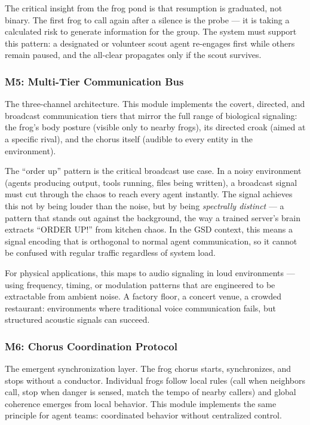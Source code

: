 \documentclass[11pt,letterpaper]{article}
\begin{document}
The critical insight from the frog pond is that resumption is graduated, not binary. The first frog to call again after a silence is the probe --- it is taking a calculated risk to generate information for the group. The system must support this pattern: a designated or volunteer scout agent re-engages first while others remain paused, and the all-clear propagates only if the scout survives.

\subsubsection{M5: Multi-Tier Communication Bus}

The three-channel architecture. This module implements the covert, directed, and broadcast communication tiers that mirror the full range of biological signaling: the frog's body posture (visible only to nearby frogs), its directed croak (aimed at a specific rival), and the chorus itself (audible to every entity in the environment).

The ``order up'' pattern is the critical broadcast use case. In a noisy environment (agents producing output, tools running, files being written), a broadcast signal must cut through the chaos to reach every agent instantly. The signal achieves this not by being louder than the noise, but by being \textit{spectrally distinct} --- a pattern that stands out against the background, the way a trained server's brain extracts ``ORDER UP!'' from kitchen chaos. In the GSD context, this means a signal encoding that is orthogonal to normal agent communication, so it cannot be confused with regular traffic regardless of system load.

For physical applications, this maps to audio signaling in loud environments --- using frequency, timing, or modulation patterns that are engineered to be extractable from ambient noise. A factory floor, a concert venue, a crowded restaurant: environments where traditional voice communication fails, but structured acoustic signals can succeed.

\subsubsection{M6: Chorus Coordination Protocol}

The emergent synchronization layer. The frog chorus starts, synchronizes, and stops without a conductor. Individual frogs follow local rules (call when neighbors call, stop when danger is sensed, match the tempo of nearby callers) and global coherence emerges from local behavior. This module implements the same principle for agent teams: coordinated behavior without centralized control.
\end{document}
